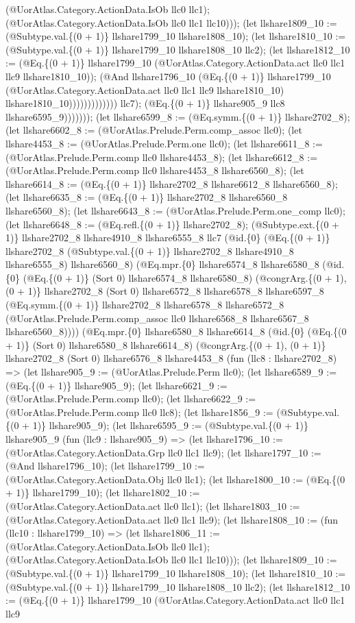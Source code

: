 \documentclass[11pt]{article}
\begin{document}
(@UorAtlas.Category.ActionData.IsOb llc0 llc1); (@UorAtlas.Category.ActionData.IsOb llc0 llc1 llc10))); (let llshare1809\_10 := (@Subtype.val.\{(0 + 1)\} llshare1799\_10 llshare1808\_10); (let llshare1810\_10 := (@Subtype.val.\{(0 + 1)\} llshare1799\_10 llshare1808\_10 llc2); (let llshare1812\_10 := (@Eq.\{(0 + 1)\} llshare1799\_10 (@UorAtlas.Category.ActionData.act llc0 llc1 llc9 llshare1810\_10)); (@And llshare1796\_10 (@Eq.\{(0 + 1)\} llshare1799\_10 (@UorAtlas.Category.ActionData.act llc0 llc1 llc9 llshare1810\_10) llshare1810\_10))))))))))))) llc7); (@Eq.\{(0 + 1)\} llshare905\_9 llc8 llshare6595\_9))))))); (let llshare6599\_8 := (@Eq.symm.\{(0 + 1)\} llshare2702\_8); (let llshare6602\_8 := (@UorAtlas.Prelude.Perm.comp\_assoc llc0); (let llshare4453\_8 := (@UorAtlas.Prelude.Perm.one llc0); (let llshare6611\_8 := (@UorAtlas.Prelude.Perm.comp llc0 llshare4453\_8); (let llshare6612\_8 := (@UorAtlas.Prelude.Perm.comp llc0 llshare4453\_8 llshare6560\_8); (let llshare6614\_8 := (@Eq.\{(0 + 1)\} llshare2702\_8 llshare6612\_8 llshare6560\_8); (let llshare6635\_8 := (@Eq.\{(0 + 1)\} llshare2702\_8 llshare6560\_8 llshare6560\_8); (let llshare6643\_8 := (@UorAtlas.Prelude.Perm.one\_comp llc0); (let llshare6648\_8 := (@Eq.refl.\{(0 + 1)\} llshare2702\_8); (@Subtype.ext.\{(0 + 1)\} llshare2702\_8 llshare4910\_8 llshare6555\_8 llc7 (@id.\{0\} (@Eq.\{(0 + 1)\} llshare2702\_8 (@Subtype.val.\{(0 + 1)\} llshare2702\_8 llshare4910\_8 llshare6555\_8) llshare6560\_8) (@Eq.mpr.\{0\} llshare6574\_8 llshare6580\_8 (@id.\{0\} (@Eq.\{(0 + 1)\} (Sort 0) llshare6574\_8 llshare6580\_8) (@congrArg.\{(0 + 1), (0 + 1)\} llshare2702\_8 (Sort 0) llshare6572\_8 llshare6578\_8 llshare6597\_8 (@Eq.symm.\{(0 + 1)\} llshare2702\_8 llshare6578\_8 llshare6572\_8 (@UorAtlas.Prelude.Perm.comp\_assoc llc0 llshare6568\_8 llshare6567\_8 llshare6560\_8)))) (@Eq.mpr.\{0\} llshare6580\_8 llshare6614\_8 (@id.\{0\} (@Eq.\{(0 + 1)\} (Sort 0) llshare6580\_8 llshare6614\_8) (@congrArg.\{(0 + 1), (0 + 1)\} llshare2702\_8 (Sort 0) llshare6576\_8 llshare4453\_8 (fun (llc8 : llshare2702\_8) => (let llshare905\_9 := (@UorAtlas.Prelude.Perm llc0); (let llshare6589\_9 := (@Eq.\{(0 + 1)\} llshare905\_9); (let llshare6621\_9 := (@UorAtlas.Prelude.Perm.comp llc0); (let llshare6622\_9 := (@UorAtlas.Prelude.Perm.comp llc0 llc8); (let llshare1856\_9 := (@Subtype.val.\{(0 + 1)\} llshare905\_9); (let llshare6595\_9 := (@Subtype.val.\{(0 + 1)\} llshare905\_9 (fun (llc9 : llshare905\_9) => (let llshare1796\_10 := (@UorAtlas.Category.ActionData.Grp llc0 llc1 llc9); (let llshare1797\_10 := (@And llshare1796\_10); (let llshare1799\_10 := (@UorAtlas.Category.ActionData.Obj llc0 llc1); (let llshare1800\_10 := (@Eq.\{(0 + 1)\} llshare1799\_10); (let llshare1802\_10 := (@UorAtlas.Category.ActionData.act llc0 llc1); (let llshare1803\_10 := (@UorAtlas.Category.ActionData.act llc0 llc1 llc9); (let llshare1808\_10 := (fun (llc10 : llshare1799\_10) => (let llshare1806\_11 := (@UorAtlas.Category.ActionData.IsOb llc0 llc1); (@UorAtlas.Category.ActionData.IsOb llc0 llc1 llc10))); (let llshare1809\_10 := (@Subtype.val.\{(0 + 1)\} llshare1799\_10 llshare1808\_10); (let llshare1810\_10 := (@Subtype.val.\{(0 + 1)\} llshare1799\_10 llshare1808\_10 llc2); (let llshare1812\_10 := (@Eq.\{(0 + 1)\} llshare1799\_10 (@UorAtlas.Category.ActionData.act llc0 llc1 llc9 
\end{document}
